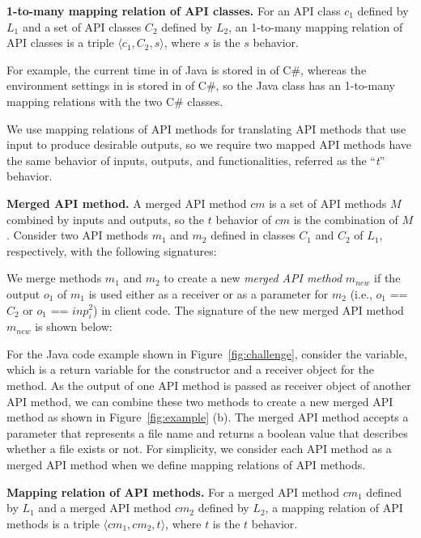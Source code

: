 \textbf{1-to-many mapping relation of API classes.} For an API class
$c_1$ defined by $L_1$ and a set of API classes $C_2$ defined by
$L_2$, an 1-to-many mapping relation of API classes is a triple
$\langle c_1, C_2, s \rangle$, where $s$ is the $s$ behavior.

For example, the current time in  of Java
is stored in  of C\#, whereas the
environment settings in  is stored in
 of C\#, so the Java class has an
1-to-many mapping relations with the two C\# classes.

We use mapping relations of API methods for translating API methods
that use input to produce desirable outputs, so we require two
mapped API methods have the same behavior of inputs, outputs, and
functionalities, referred as the ``\emph{t}'' behavior.

\textbf{Merged API method.} A merged API method $cm$ is a set of API
methods $M$ combined by inputs and outputs, so the $t$ behavior of
$cm$ is the combination of $M$. Consider two API methods $m_1$ and
$m_2$ defined in classes $C_1$ and $C_2$ of $L_1$, respectively,
with the following signatures:



We merge methods $m_1$ and $m_2$ to create a new \emph{merged API
method} $m_{new}$ if the output $o_1$ of $m_1$ is used either as a
receiver or as a parameter for $m_2$ (i.e., $o_1$ == $C_2$ or $o_1$
== $inp_i^2$) in client code. The signature of the new merged API
method $m_{new}$ is shown below:


For the Java code example shown in Figure~\ref{fig:challenge},
consider the  variable, which is a return variable for
the constructor and a receiver object for the 
method. As the output of one API method is passed as receiver object
of another API method, we can combine these two methods to create a
new merged API method  as shown
in Figure~\ref{fig:example} (b). The merged API method accepts a
 parameter that represents a file name and returns a
boolean value that describes whether a file exists or not. For
simplicity, we consider each API method as a merged API method when
we define mapping relations of API methods.

\textbf{Mapping relation of API methods.} For a merged API method
$cm_1$ defined by $L_1$ and a merged API method $cm_2$ defined by
$L_2$, a mapping relation of API methods is a triple $\langle cm_1,
cm_2, t \rangle$, where $t$ is the $t$ behavior.
